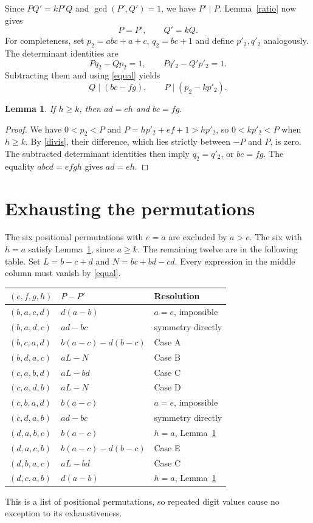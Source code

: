 \documentclass[11pt]{article}
\newtheorem{lemma}{Lemma}
\begin{document}
Since $PQ'=kP'Q$ and $\gcd(P',Q')=1$, we have $P'\mid P$.
Lemma~\ref{ratio} now gives
\begin{equation}\label{equal}
 P=P',\qquad Q'=kQ.
\end{equation}
For completeness, set $p_2=abc+a+c$, $q_2=bc+1$ and define
$p'_2,q'_2$ analogously. The determinant identities are
\[
 Pq_2-Qp_2=1,\qquad Pq'_2-Q'p'_2=1.
\]
Subtracting them and using \eqref{equal} yields
\begin{equation}\label{divis}
 Q\mid(bc-fg),\qquad P\mid(p_2-kp'_2).
\end{equation}

\begin{lemma}\label{last}
If $h\ge k$, then $ad=eh$ and $bc=fg$.
\end{lemma}
\begin{proof}
We have $0<p_2<P$ and $P=hp'_2+ef+1>hp'_2$, so
$0<kp'_2<P$ when $h\ge k$. By \eqref{divis}, their difference,
which lies strictly between $-P$ and $P$, is zero.
The subtracted determinant identities then imply $q_2=q'_2$,
or $bc=fg$. The equality $abcd=efgh$ gives $ad=eh$.
\end{proof}

\section*{Exhausting the permutations}
The six positional permutations with $e=a$ are excluded by $a>e$.
The six with $h=a$ satisfy Lemma~\ref{last}, since $a\ge k$.
The remaining twelve are in the following table. Set
$L=b-c+d$ and $N=bc+bd-cd$. Every expression in the middle column
must vanish by \eqref{equal}.
\begin{center}
\begin{tabular}{lll}
\toprule
$(e,f,g,h)$ & $P-P'$ & Resolution\\
\midrule
$(b,a,c,d)$ & $d(a-b)$ & $a=e$, impossible\\
$(b,a,d,c)$ & $ad-bc$ & symmetry directly\\
$(b,c,a,d)$ & $b(a-c)-d(b-c)$ & Case A\\
$(b,d,a,c)$ & $aL-N$ & Case B\\
$(c,a,b,d)$ & $aL-bd$ & Case C\\
$(c,a,d,b)$ & $aL-N$ & Case D\\
$(c,b,a,d)$ & $b(a-c)$ & $a=e$, impossible\\
$(c,d,a,b)$ & $ad-bc$ & symmetry directly\\
$(d,a,b,c)$ & $b(a-c)$ & $h=a$, Lemma~\ref{last}\\
$(d,a,c,b)$ & $b(a-c)-d(b-c)$ & Case E\\
$(d,b,a,c)$ & $aL-bd$ & Case C\\
$(d,c,a,b)$ & $d(a-b)$ & $h=a$, Lemma~\ref{last}\\
\bottomrule
\end{tabular}
\end{center}
This is a list of positional permutations, so repeated digit values
cause no exception to its exhaustiveness.
\end{document}
